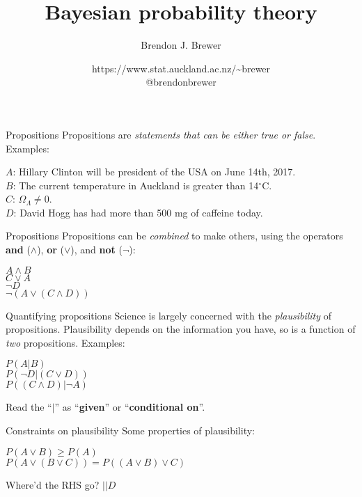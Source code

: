 \documentclass{beamer}
\author{Brendon J. Brewer}
\title{Bayesian probability theory}
\institute{Department of Statistics, The University of Auckland}
\date{{\color{blue} https://www.stat.auckland.ac.nz/\~{ }brewer}\\
\vspace{10pt}
{\color{blue} @brendonbrewer}}
\begin{document}
\begin{frame}[t,plain]
\titlepage
\end{frame}

\begin{frame}[t]{Propositions}
Propositions are {\it statements that can be either true or false}.\\
Examples:\vspace{20pt}

$A$: {\small Hillary Clinton will be president of the USA on June 14th, 2017.}\\
$B$: {\small The current temperature in Auckland is greater than 14$^{\circ}$C.}\\
$C$: {\small $\Omega_\Lambda \neq 0$.}\\
$D$: {\small David Hogg has had more than 500 mg of caffeine today.}
\end{frame}

\begin{frame}[t]{Propositions}
Propositions can be {\it combined} to make others, using the operators
{\bf and} ($\wedge$), {\bf or} ($\vee$), and {\bf not} ($\neg$): \vspace{20pt}

$A \wedge B$\\
$C \vee A$\\
$\neg D$\\
$\neg (A \vee (C \wedge D))$
\end{frame}

\begin{frame}[t]{Quantifying propositions}
Science is largely concerned with the {\it plausibility} of propositions.
Plausibility depends on the information you have, so is a function of {\it
two} propositions. Examples:\vspace{20pt}

$P(A | B)$\\
$P(\neg D | (C \vee D))$\\
$P((C \wedge D) | \neg A)$\vspace{20pt}

Read the ``$|$'' as ``{\bf given}'' or ``{\bf conditional on}''.
\end{frame}


\begin{frame}[t]{Constraints on plausibility}
Some properties of plausibility:\vspace{20pt}

$P(A \vee B) \geq P(A)$\\
$P(A \vee (B \vee C)) = P((A \vee B) \vee C)$\vspace{20pt}

Where'd the RHS go? $|| D$
\end{frame}
\end{document}
